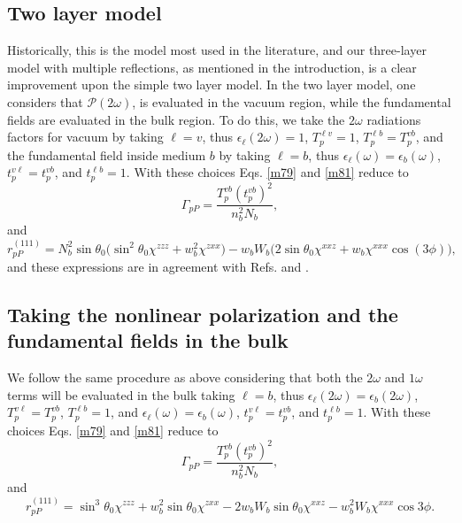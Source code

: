 

\subsection{Two layer model}\label{sec:2layer}

Historically, this is the model most used in the literature, and our three-layer model with multiple reflections, as mentioned in the introduction, is a clear improvement upon the simple two layer model. In the two layer model, one considers that $\boldsymbol{\mathcal{P}}(2\omega)$, is evaluated in the vacuum region, while the fundamental fields are evaluated in the bulk region.\cite{sipePRB87, mizrahiJOSA88} To do this, we take the $2\omega$ radiations factors for vacuum by taking $\ell=v$, thus $\epsilon_{\ell}(2\omega)=1$, $T^{\ell v}_{p}=1$, $T^{\ell b}_{p} = T^{vb}_{p}$, and the fundamental field inside medium $b$ by taking $\ell=b$, thus $\epsilon_{\ell}(\omega)=\epsilon_{b}(\omega)$, $t^{v\ell}_{p}=t^{vb}_{p}$, and $t^{\ell b}_{p}=1$. With these choices Eqs. \eqref{m79} and \eqref{m81} reduce to
\begin{equation}\label{eq:m78}
\Gamma_{pP}
= \frac{T^{v b}_{p}(t^{vb}_{p})^2}
       {n^{2}_{b}N_{b}}, 
\end{equation}
and
\begin{equation}\label{eq:m82}
r^{(111)}_{pP} =
N^{2}_{b}\sin\theta_{0}
\Big(
\sin^{2}\theta_{0}\chi^{zzz} + w^{2}_{b}\chi^{zxx}
\Big)
- w_{b}W_{b}
\Big(
2\sin\theta_{0}\chi^{xxz} + w_{b}\chi^{xxx}\cos(3\phi)
\Big),
\end{equation}
and these expressions are in agreement with Refs. \cite{sipePRB87} and
\cite{mizrahiJOSA88}.



\subsection{Taking the nonlinear polarization and the fundamental fields in the
bulk}\label{sec:bulk}

We follow the same procedure as above considering that both the $2\omega$ and $1\omega$ terms will be evaluated in the bulk taking $\ell = b$, thus $\epsilon_{\ell}(2\omega)=\epsilon_{b}(2\omega)$, $T^{v\ell}_{p}=T^{vb}_{p}$, $T^{\ell b}_{p} = 1$, and $\epsilon_{\ell}(\omega)=\epsilon_{b}(\omega)$, $t^{v\ell}_{p} = t^{vb}_{p}$, and $t^{\ell b}_{p} = 1$. With these choices Eqs. \eqref{m79} and \eqref{m81} reduce to
\begin{equation}
\Gamma_{pP} =
\frac{T_{p}^{vb}\left(t^{vb}_{p}\right)^{2}}
     {n^{2}_{b}N_{b}}, 
\end{equation}
and
\begin{equation}
r^{(111)}_{pP} =
  \sin^{3}\theta_{0}\chi^{zzz}
 + w^{2}_{b}\sin\theta_{0}\chi^{zxx} 
 - 2w_{b}W_{b}\sin\theta_{0}\chi^{xxz}
 - w^{2}_{b}W_{b}\chi^{xxx}\cos3\phi.
\end{equation}


